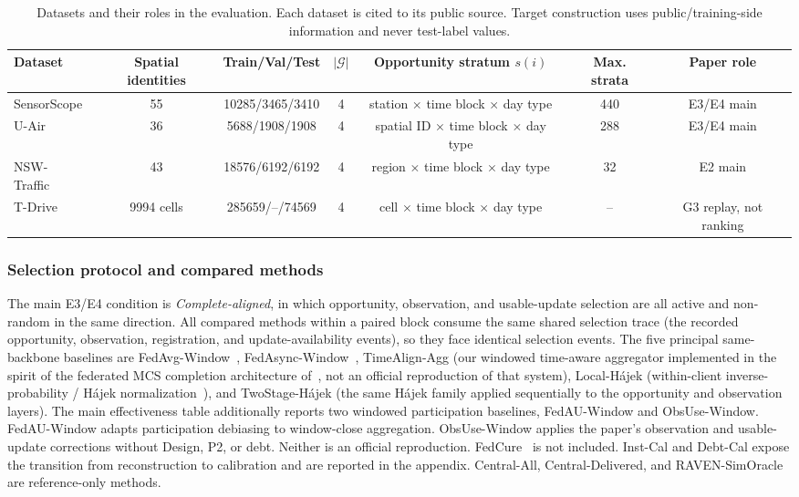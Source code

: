 \documentclass[letterpaper,journal]{IEEEtran}
\begin{document}
\begin{table}[t]
\centering
\caption{Datasets and their roles in the evaluation.  Each dataset is cited to
its public source.  Target construction uses public/training-side information
and never test-label values.}
\label{tab:datasets}
\setlength{\tabcolsep}{4.5pt}
\begin{tabular}{lcccccc}
\toprule
Dataset & Spatial identities & Train/Val/Test & $|\mathcal G|$ &
Opportunity stratum $s(i)$ & Max. strata & Paper role\\
\midrule
SensorScope~\cite{ingelrest2010sensorscope} & 55 & 10285/3465/3410 & 4 &
station $\times$ time block $\times$ day type & 440 & E3/E4 main\\
U-Air~\cite{zheng2013uair} & 36 & 5688/1908/1908 & 4 &
spatial ID $\times$ time block $\times$ day type & 288 & E3/E4 main\\
NSW-Traffic~\cite{tfnsw2024traffic} & 43 & 18576/6192/6192 & 4 &
region $\times$ time block $\times$ day type & 32 & E2 main\\
T-Drive~\cite{yuan2010tdrive} & 9994 cells & 285659/--/74569 & 4 &
cell $\times$ time block $\times$ day type & -- & G3 replay, not ranking\\
\bottomrule
\end{tabular}
\end{table}

\subsubsection{Selection protocol and compared methods}

The main E3/E4 condition is \emph{Complete-aligned}, in which opportunity,
observation, and usable-update selection are all active and non-random in the
same direction.  All compared methods within a paired block consume the same
shared selection trace (the recorded opportunity, observation, registration,
and update-availability events), so they face identical selection events.
The five principal same-backbone baselines are
FedAvg-Window~\cite{mcmahan2017communication},
FedAsync-Window~\cite{xie2019asynchronous},
TimeAlign-Agg (our windowed time-aware aggregator implemented in the spirit of
the federated MCS completion architecture of~\cite{wang2026federated}, not an
official reproduction of that system),
Local-H\'ajek (within-client inverse-probability / H\'ajek
normalization~\cite{horvitz1952generalization,hajek1971comment}), and
TwoStage-H\'ajek (the same H\'ajek family applied sequentially to the
opportunity and observation layers).  The main effectiveness table additionally
reports two windowed participation baselines, FedAU-Window and
ObsUse-Window.  FedAU-Window adapts participation debiasing
\cite{wang2024lightweight} to window-close aggregation.
ObsUse-Window applies the paper's observation and usable-update
corrections without Design, P2, or debt.  Neither is an official
reproduction.  FedCure~\cite{chen2026fedcure} is not included.  Inst-Cal and Debt-Cal
expose the transition from reconstruction to calibration and are
reported in the appendix.  Central-All, Central-Delivered, and
RAVEN-SimOracle are reference-only methods.
\end{document}
